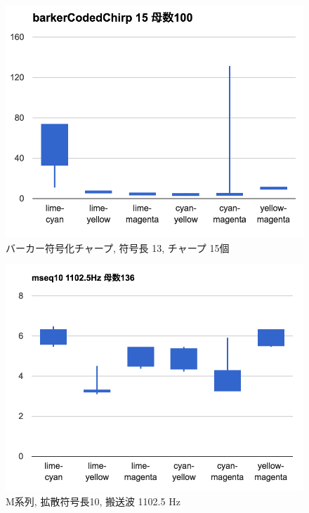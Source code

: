 \begin{figure}[p]
  \centering
  \includegraphics[clip,width=1.05\hsize]{img/bcc15.png}
  \caption{バーカー符号化チャープ, 符号長 13, チャープ 15個}\label{fig:bcc15}
\end{figure}


\clearpage



\begin{figure}[p]
  \centering
  \includegraphics[clip,width=1.05\hsize]{img/m10_1102.png}
  \caption{M系列, 拡散符号長10, 搬送波 1102.5 Hz}\label{fig:m10Z1102}
\end{figure}

